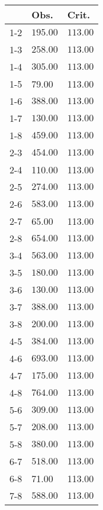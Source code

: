 \begin{table}[ht]
\centering
\begin{tabular}{rll}
  \hline
 & Obs. & Crit. \\ 
  \hline
1-2 & \(\mathbf{195.00}\) & \(\mathbf{113.00}\) \\ 
  1-3 & \(\mathbf{258.00}\) & \(\mathbf{113.00}\) \\ 
  1-4 & \(\mathbf{305.00}\) & \(\mathbf{113.00}\) \\ 
  1-5 & 79.00 & 113.00 \\ 
  1-6 & \(\mathbf{388.00}\) & \(\mathbf{113.00}\) \\ 
  1-7 & \(\mathbf{130.00}\) & \(\mathbf{113.00}\) \\ 
  1-8 & \(\mathbf{459.00}\) & \(\mathbf{113.00}\) \\ 
  2-3 & \(\mathbf{454.00}\) & \(\mathbf{113.00}\) \\ 
  2-4 & 110.00 & 113.00 \\ 
  2-5 & \(\mathbf{274.00}\) & \(\mathbf{113.00}\) \\ 
  2-6 & \(\mathbf{583.00}\) & \(\mathbf{113.00}\) \\ 
  2-7 & 65.00 & 113.00 \\ 
  2-8 & \(\mathbf{654.00}\) & \(\mathbf{113.00}\) \\ 
  3-4 & \(\mathbf{563.00}\) & \(\mathbf{113.00}\) \\ 
  3-5 & \(\mathbf{180.00}\) & \(\mathbf{113.00}\) \\ 
  3-6 & \(\mathbf{130.00}\) & \(\mathbf{113.00}\) \\ 
  3-7 & \(\mathbf{388.00}\) & \(\mathbf{113.00}\) \\ 
  3-8 & \(\mathbf{200.00}\) & \(\mathbf{113.00}\) \\ 
  4-5 & \(\mathbf{384.00}\) & \(\mathbf{113.00}\) \\ 
  4-6 & \(\mathbf{693.00}\) & \(\mathbf{113.00}\) \\ 
  4-7 & \(\mathbf{175.00}\) & \(\mathbf{113.00}\) \\ 
  4-8 & \(\mathbf{764.00}\) & \(\mathbf{113.00}\) \\ 
  5-6 & \(\mathbf{309.00}\) & \(\mathbf{113.00}\) \\ 
  5-7 & \(\mathbf{208.00}\) & \(\mathbf{113.00}\) \\ 
  5-8 & \(\mathbf{380.00}\) & \(\mathbf{113.00}\) \\ 
  6-7 & \(\mathbf{518.00}\) & \(\mathbf{113.00}\) \\ 
  6-8 & 71.00 & 113.00 \\ 
  7-8 & \(\mathbf{588.00}\) & \(\mathbf{113.00}\) \\ 
   \hline
\end{tabular}
\end{table}
